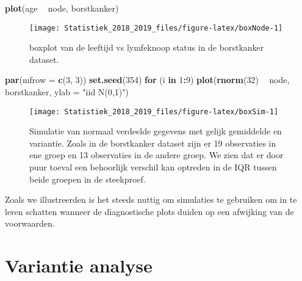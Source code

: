 \documentclass[12pt,dutch,coursenotes]{book}
\newenvironment{Shaded}{\begin{snugshade}}{\end{snugshade}}
\newcommand{\KeywordTok}[1]{\textcolor[rgb]{0.13,0.29,0.53}{\textbf{#1}}}
\newcommand{\DataTypeTok}[1]{\textcolor[rgb]{0.13,0.29,0.53}{#1}}
\newcommand{\DecValTok}[1]{\textcolor[rgb]{0.00,0.00,0.81}{#1}}
\newcommand{\StringTok}[1]{\textcolor[rgb]{0.31,0.60,0.02}{#1}}
\newcommand{\ControlFlowTok}[1]{\textcolor[rgb]{0.13,0.29,0.53}{\textbf{#1}}}
\newcommand{\OperatorTok}[1]{\textcolor[rgb]{0.81,0.36,0.00}{\textbf{#1}}}
\newcommand{\NormalTok}[1]{#1}
\theoremstyle{definition}
\theoremstyle{definition}
\theoremstyle{definition}
\theoremstyle{remark}
\begin{document}
\begin{Shaded}
\begin{Highlighting}[]
\KeywordTok{plot}\NormalTok{(age }\OperatorTok{~}\StringTok{ }\NormalTok{node, borstkanker)}
\end{Highlighting}
\end{Shaded}

\begin{figure}

{\centering \texttt{[image: Statistiek\_2018\_2019\_files/figure-latex/boxNode-1]} 

}

\caption{boxplot van de leeftijd vs lymfeknoop status in de borstkanker dataset.}\label{fig:boxNode}
\end{figure}

\begin{Shaded}
\begin{Highlighting}[]
\KeywordTok{par}\NormalTok{(}\DataTypeTok{mfrow =} \KeywordTok{c}\NormalTok{(}\DecValTok{3}\NormalTok{, }\DecValTok{3}\NormalTok{))}
\KeywordTok{set.seed}\NormalTok{(}\DecValTok{354}\NormalTok{)}
\ControlFlowTok{for}\NormalTok{ (i }\ControlFlowTok{in} \DecValTok{1}\OperatorTok{:}\DecValTok{9}\NormalTok{) }\KeywordTok{plot}\NormalTok{(}\KeywordTok{rnorm}\NormalTok{(}\DecValTok{32}\NormalTok{) }\OperatorTok{~}\StringTok{ }\NormalTok{node, borstkanker, }
    \DataTypeTok{ylab =} \StringTok{"iid N(0,1)"}\NormalTok{)}
\end{Highlighting}
\end{Shaded}

\begin{figure}

{\centering \texttt{[image: Statistiek\_2018\_2019\_files/figure-latex/boxSim-1]} 

}

\caption{Simulatie van normaal verdeelde gegevens met gelijk gemiddelde en variantie. Zoals in de borstkanker dataset zijn er 19 observaties in ene groep en 13 observaties in de andere groep. We zien dat er door puur toeval een behoorlijk verschil kan optreden in de IQR tussen beide groepen in de steekproef.}\label{fig:boxSim}
\end{figure}

Zoals we illustreerden is het steeds nuttig om simulaties te gebruiken
om in te leren schatten wanneer de diagnostische plots duiden op een
afwijking van de voorwaarden.

\chapter{Variantie analyse}\label{chap:anova}
\end{document}

